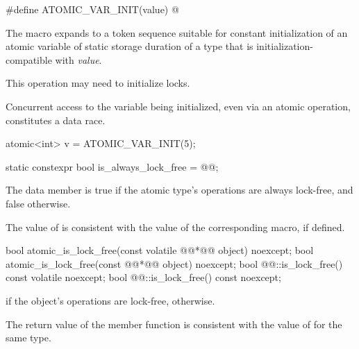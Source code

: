 \begin{itemdecl}
#define ATOMIC_VAR_INIT(value) @\seebelow@
\end{itemdecl}

\begin{itemdescr}
\pnum
The macro expands to a token sequence suitable for
constant initialization of
an atomic variable of static storage duration of a type that is
initialization-compatible with \textit{value}.
\begin{note} This operation may need to initialize locks. \end{note}
Concurrent access to the variable being initialized, even via an atomic operation,
constitutes a data race. \begin{example}
\begin{codeblock}
atomic<int> v = ATOMIC_VAR_INIT(5);
\end{codeblock}
\end{example}
\end{itemdescr}

%
%
\begin{itemdecl}
static constexpr bool is_always_lock_free = @\impdef{}@;
\end{itemdecl}

\begin{itemdescr}
\pnum
The  data member  is true
if the atomic type's operations are always lock-free, and false otherwise.
\begin{note}
The value of  is consistent with the value of
the corresponding  macro, if defined.
\end{note}
\end{itemdescr}

%
%
\begin{itemdecl}
bool atomic_is_lock_free(const volatile @@*@\itcorr[-1]@ object) noexcept;
bool atomic_is_lock_free(const @@*@\itcorr[-1]@ object) noexcept;
bool @@::is_lock_free() const volatile noexcept;
bool @@::is_lock_free() const noexcept;
\end{itemdecl}

\begin{itemdescr}
\pnum
\returns {} if the object's operations are lock-free,  otherwise.
\begin{note}
The return value of the  member function
is consistent with the value of  for the same type.
\end{note}
\end{itemdescr}

